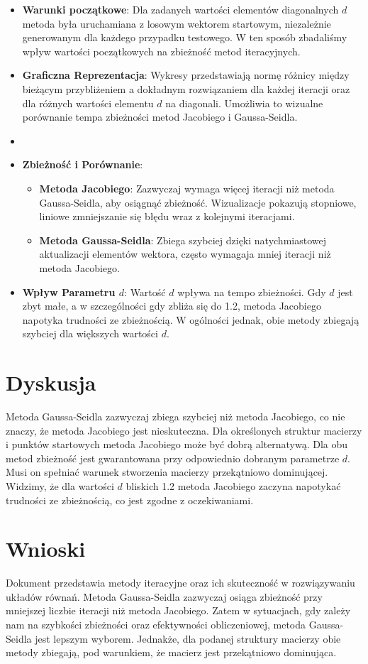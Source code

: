 \documentclass{article}
\begin{document}
\begin{itemize}

    \item \textbf{Warunki początkowe}: Dla zadanych wartości elementów diagonalnych \( d \) metoda była uruchamiana z losowym wektorem startowym,
    niezależnie generowanym dla każdego przypadku testowego. W ten sposób zbadaliśmy wpływ wartości początkowych na zbieżność metod iteracyjnych.
    \item \textbf{Graficzna Reprezentacja}:
    Wykresy przedstawiają normę różnicy między bieżącym przybliżeniem a dokładnym rozwiązaniem dla każdej iteracji oraz dla różnych wartości elementu \( d \) na diagonali.
    Umożliwia to wizualne porównanie tempa zbieżności metod Jacobiego i Gaussa-Seidla.
    \item \item \textbf{Zbieżność i Porównanie}:
    \begin{itemize}
        \item \textbf{Metoda Jacobiego}: Zazwyczaj wymaga więcej iteracji niż metoda Gaussa-Seidla, aby osiągnąć zbieżność.
         Wizualizacje pokazują stopniowe, liniowe zmniejszanie się błędu wraz z kolejnymi iteracjami.
        \item \textbf{Metoda Gaussa-Seidla}: Zbiega szybciej dzięki natychmiastowej aktualizacji elementów wektora,
         często wymagaja mniej iteracji niż metoda Jacobiego.
    \end{itemize}
    \item \textbf{Wpływ Parametru \( d \)}:
    Wartość \( d \) wpływa na tempo zbieżności. Gdy \( d \) jest zbyt małe, a w szczególności gdy zbliża się do 1.2,
    metoda Jacobiego napotyka trudności ze zbieżnością. W ogólności jednak, obie metody zbiegają szybciej dla większych wartości \( d \).
\end{itemize}

\section{Dyskusja}
Metoda Gaussa-Seidla zazwyczaj zbiega szybciej niż metoda Jacobiego, co nie znaczy, że metoda Jacobiego jest nieskuteczna.
Dla określonych struktur macierzy i punktów startowych metoda Jacobiego może być dobrą alternatywą.
Dla obu metod zbieżność jest gwarantowana przy odpowiednio dobranym parametrze \( d \). Musi on spełniać warunek stworzenia macierzy przekątniowo dominującej.
Widzimy, że dla wartości \( d \) bliskich 1.2 metoda Jacobiego zaczyna napotykać trudności ze zbieżnością, co jest zgodne z oczekiwaniami.


\section{Wnioski}
Dokument przedstawia metody iteracyjne oraz ich skuteczność w rozwiązywaniu układów równań.
Metoda Gaussa-Seidla zazwyczaj osiąga zbieżność przy mniejszej liczbie iteracji niż metoda Jacobiego.
Zatem w sytuacjach, gdy zależy nam na szybkości zbieżności oraz efektywności obliczeniowej, metoda Gaussa-Seidla jest lepszym wyborem.
Jednakże, dla podanej struktury macierzy obie metody zbiegają, pod warunkiem, że macierz jest przekątniowo dominująca.
\end{document}
